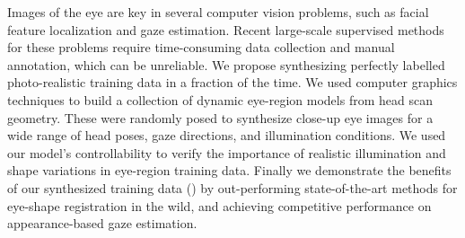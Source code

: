 Images of the eye are key in several computer vision problems, such as facial feature localization and gaze estimation.
Recent large-scale supervised methods for these problems require time-consuming data collection and manual annotation, which can be unreliable.
We propose synthesizing perfectly labelled photo-realistic training data in a fraction of the time.
We used computer graphics techniques to build a collection of dynamic eye-region models from head scan geometry.
These were randomly posed to synthesize close-up eye images for a wide range of head poses, gaze directions, and illumination conditions.
%
We used our model's controllability to verify the importance of realistic illumination and shape variations in eye-region training data.
%
Finally we demonstrate the benefits of our synthesized training data (\dataset) by out-performing state-of-the-art methods for eye-shape registration in the wild, and achieving competitive performance on appearance-based gaze estimation.
